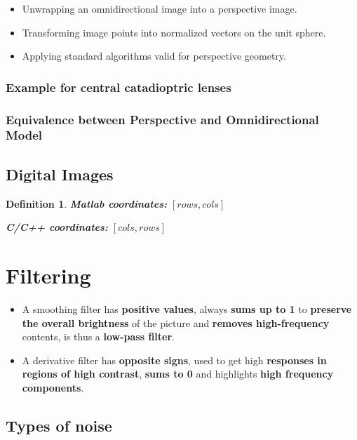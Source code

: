 \documentclass[10pt,a4paper]{scrartcl}
\newtheorem{define}{Definition}
\begin{document}
\begin{multicols*}{2}
\begin{itemize}
\item Unwrapping an omnidirectional image into a perspective image.
\item Transforming image points into normalized vectors on the unit sphere.
\item Applying standard algorithms valid for perspective geometry.
\end{itemize}

\subsubsection{Example for central catadioptric lenses}


\subsubsection{Equivalence between Perspective and Omnidirectional Model}


\subsection{Digital Images}

\begin{define}

\textbf{Matlab coordinates:} $[rows,cols]$

\textbf{C/C++ coordinates:} $[cols,rows]$
\end{define}

\section{Filtering}

\begin{itemize}
\item A smoothing filter has \textbf{positive values}, always \textbf{sums up to 1} to \textbf{preserve the overall brightness} of the picture and \textbf{removes high-frequency} contents, is thus a \textbf{low-pass filter}.
\item A derivative filter has \textbf{opposite signs}, used to get high \textbf{responses in regions of high contrast}, \textbf{sums to 0} and highlights \textbf{high frequency components}.
\end{itemize}

\subsection{Types of noise}


\end{multicols*}
\end{document}
